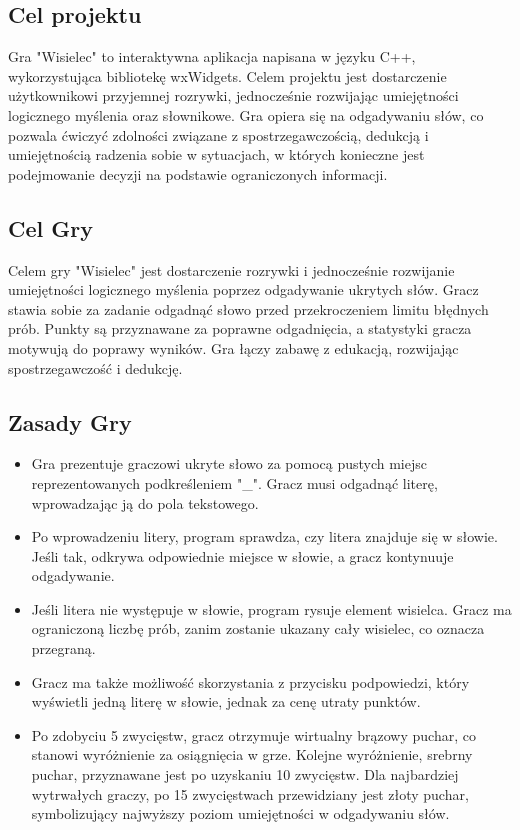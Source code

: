 \documentclass[]{report}
\begin{document}
	\subsection*{Cel projektu}
	
Gra "Wisielec" to interaktywna aplikacja napisana w języku C++, wykorzystująca bibliotekę wxWidgets. Celem projektu jest dostarczenie użytkownikowi przyjemnej rozrywki, jednocześnie rozwijając umiejętności logicznego myślenia oraz słownikowe. Gra opiera się na odgadywaniu słów, co pozwala ćwiczyć zdolności związane z spostrzegawczością, dedukcją i umiejętnością radzenia sobie w sytuacjach, w których konieczne jest podejmowanie decyzji na podstawie ograniczonych informacji.
	
	\subsection*{Cel Gry}
	
Celem gry "Wisielec" jest dostarczenie rozrywki i jednocześnie rozwijanie umiejętności logicznego myślenia poprzez odgadywanie ukrytych słów. Gracz stawia sobie za zadanie odgadnąć słowo przed przekroczeniem limitu błędnych prób. Punkty są przyznawane za poprawne odgadnięcia, a statystyki gracza motywują do poprawy wyników. Gra łączy zabawę z edukacją, rozwijając spostrzegawczość i dedukcję.
	
	\subsection*{Zasady Gry}
	
	\begin{itemize}
		\item Gra prezentuje graczowi ukryte słowo za pomocą pustych miejsc reprezentowanych podkreśleniem "\_". Gracz musi odgadnąć literę, wprowadzając ją do pola tekstowego.
		\item Po wprowadzeniu litery, program sprawdza, czy litera znajduje się w słowie. Jeśli tak, odkrywa odpowiednie miejsce w słowie, a gracz kontynuuje odgadywanie.
		\item Jeśli litera nie występuje w słowie, program rysuje element wisielca. Gracz ma ograniczoną liczbę prób, zanim zostanie ukazany cały wisielec, co oznacza przegraną.
		\item Gracz ma także możliwość skorzystania z przycisku podpowiedzi, który wyświetli jedną literę w słowie, jednak za cenę utraty punktów.
		\item Po zdobyciu 5 zwycięstw, gracz otrzymuje wirtualny brązowy puchar, co stanowi wyróżnienie za osiągnięcia w grze. Kolejne wyróżnienie, srebrny puchar, przyznawane jest po uzyskaniu 10 zwycięstw. Dla najbardziej wytrwałych graczy, po 15 zwycięstwach przewidziany jest złoty puchar, symbolizujący najwyższy poziom umiejętności w odgadywaniu słów. 
		
		
	\end{itemize}
\newpage
\end{document}
